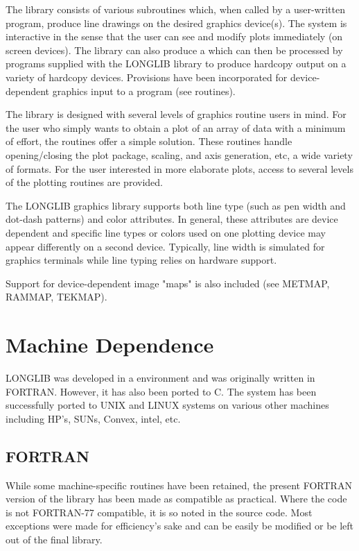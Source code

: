 \documentclass[11pt]{report}
\begin{document}
The library consists of various subroutines which, when called by a
user-written program, produce line drawings on the desired
graphics device(s).  The system is interactive in the sense that the
user can see and modify plots immediately (on screen devices).  The
library can also produce a  which can then be processed by
programs supplied with the LONGLIB library to produce hardcopy output
on a variety of hardcopy devices.  Provisions have been incorporated
for device-dependent graphics input to a program (see 
routines).

The library is designed with several levels of graphics routine users
in mind.  For the user who simply wants to obtain a plot of an array
of data with a minimum of effort, the  routines offer a
simple solution.  These routines handle opening/closing the plot
package, scaling, and axis generation, etc, a wide variety of formats.
For the user interested in more elaborate plots, access to several
levels of the plotting routines are provided.

The LONGLIB graphics library supports both line type (such as pen
width and dot-dash patterns) and color attributes.  In general, these
attributes are device dependent and specific line types or colors used
on one plotting device may appear differently on a second device.
Typically, line width is simulated for graphics terminals while line
typing relies on hardware support.

Support for device-dependent image "maps" is also included (see
METMAP, RAMMAP, TEKMAP).

\section{Machine Dependence}

LONGLIB was developed in a  environment and was originally
written in FORTRAN.  However, it has also been ported to C.  The
system has been successfully ported to UNIX and LINUX systems on
various other machines including HP's, SUNs, Convex, intel, etc.

\subsection{FORTRAN}
While some machine-specific routines have been retained, the present
FORTRAN version of the library has been made as 
compatible as practical.  Where the code is not FORTRAN-77 compatible,
it is so noted in the source code.  Most exceptions were made for
efficiency's sake and can be easily be modified or be left out of the
final library.
\end{document}
